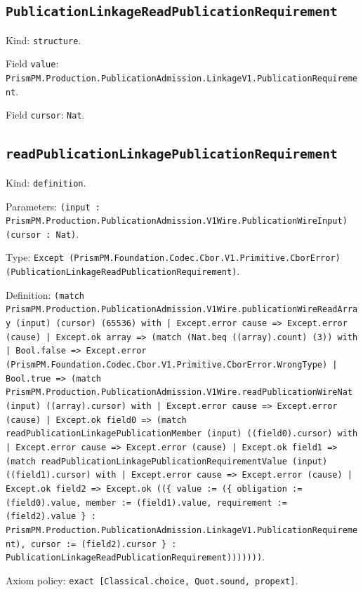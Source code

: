 \documentclass[11pt]{article}
\begin{document}
\subsection*{\texttt{PublicationLinkageReadPublicationRequirement}}
\noindent Kind: \texttt{structure}.\par
\noindent Field \texttt{value}: \texttt{PrismPM.Production.PublicationAdmission.LinkageV1.PublicationRequirement}.\par
\noindent Field \texttt{cursor}: \texttt{Nat}.\par
\subsection*{\texttt{readPublicationLinkagePublicationRequirement}}
\noindent Kind: \texttt{definition}.\par
\noindent Parameters: \texttt{(input : PrismPM.Production.PublicationAdmission.V1Wire.PublicationWireInput) (cursor : Nat)}.\par
\noindent Type: \texttt{Except (PrismPM.Foundation.Codec.Cbor.V1.Primitive.CborError) (PublicationLinkageReadPublicationRequirement)}.\par
\noindent Definition: \texttt{(match PrismPM.Production.PublicationAdmission.V1Wire.publicationWireReadArray (input) (cursor) (65536) with | Except.error cause => Except.error (cause) | Except.ok array => (match (Nat.beq ((array).count) (3)) with | Bool.false => Except.error (PrismPM.Foundation.Codec.Cbor.V1.Primitive.CborError.WrongType) | Bool.true => (match PrismPM.Production.PublicationAdmission.V1Wire.readPublicationWireNat (input) ((array).cursor) with | Except.error cause => Except.error (cause) | Except.ok field0 => (match readPublicationLinkagePublicationMember (input) ((field0).cursor) with | Except.error cause => Except.error (cause) | Except.ok field1 => (match readPublicationLinkagePublicationRequirementValue (input) ((field1).cursor) with | Except.error cause => Except.error (cause) | Except.ok field2 => Except.ok ((\{ value := (\{ obligation := (field0).value, member := (field1).value, requirement := (field2).value \} : PrismPM.Production.PublicationAdmission.LinkageV1.PublicationRequirement), cursor := (field2).cursor \} : PublicationLinkageReadPublicationRequirement)))))))}.\par
\noindent Axiom policy: \texttt{exact [Classical.choice, Quot.sound, propext]}.\par
\end{document}
